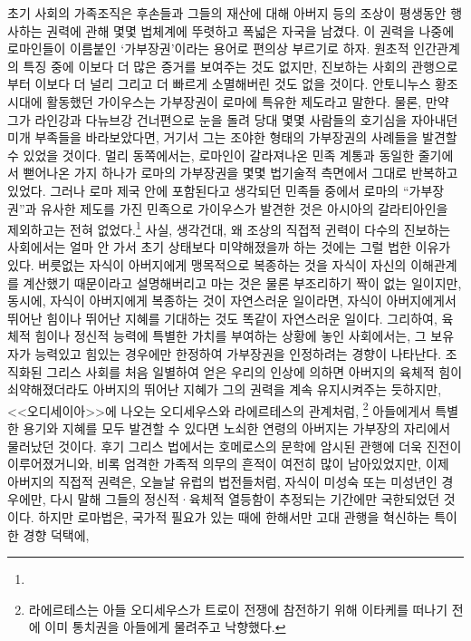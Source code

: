 초기 사회의 가족조직은
후손들과 그들의 재산에 대해
아버지 등의 조상이 평생동안 행사하는 권력에 관해
몇몇 법체계에 뚜렷하고 폭넓은 자국을 남겼다.
이 권력을 나중에 로마인들이 이름붙인
`가부장권'이라는 용어로 편의상 부르기로 하자.
원초적 인간관계의 특징 중에 이보다 더 많은 증거를 보여주는 것도 없지만,
진보하는 사회의 관행으로부터 이보다 더 널리 그리고 더 빠르게
소멸해버린 것도 없을 것이다.
안토니누스 황조 시대에 활동했던 가이우스는
가부장권이 로마에 특유한 제도라고 말한다.
물론, 만약 그가 라인강과 다뉴브강 건너편으로 눈을 돌려
당대 몇몇 사람들의 호기심을 자아내던 미개 부족들을 바라보았다면,
거기서 그는 조야한 형태의 가부장권의 사례들을 발견할 수 있었을 것이다.
멀리 동쪽에서는, 로마인이 갈라져나온 민족 계통과 동일한 줄기에서
뻗어나온 가지 하나가 로마의 가부장권을 몇몇 법기술적 측면에서
그대로 반복하고 있었다.
그러나
로마 제국 안에 포함된다고 생각되던 민족들 중에서
로마의 ``가부장권''과 유사한 제도를 가진 민족으로
가이우스가
발견한 것은
아시아의 갈라티아인을 제외하고는
전혀 없었다.\footnote{}
사실, 생각건대,
왜 조상의 직접적 귄력이
다수의 진보하는 사회에서는
얼마 안 가서 초기 상태보다 미약해졌을까 하는 것에는
그럴 법한 이유가 있다.
버릇없는 자식이 아버지에게 맹목적으로 복종하는 것을
자식이 자신의 이해관계를 계산했기 때문이라고 설명해버리고 마는 것은
물론 부조리하기 짝이 없는 일이지만,
동시에, 자식이 아버지에게 복종하는 것이 자연스러운 일이라면,
자식이 아버지에게서 뛰어난 힘이나 뛰어난 지혜를 기대하는 것도 똑같이
자연스러운 일이다.
그리하여,
육체적 힘이나 정신적 능력에 특별한 가치를 부여하는 상황에 놓인 사회에서는,
그 보유자가 능력있고 힘있는 경우에만 한정하여
가부장권을
인정하려는 경향이 나타난다.
조직화된 그리스 사회를 처음 일별하여 얻은 우리의 인상에 의하면
아버지의 육체적 힘이 쇠약해졌더라도 아버지의 뛰어난 지혜가
그의 권력을 계속 유지시켜주는 듯하지만,
<<오디세이아>>에 나오는
오디세우스와 라에르테스의 관계처럼,%
\footnote{라에르테스는 아들 오디세우스가 트로이 전쟁에 참전하기 위해
이타케를 떠나기 전에 이미 통치권을 아들에게 물려주고 낙향했다.}
아들에게서 특별한 용기와 지혜를 모두 발견할 수 있다면
노쇠한 연령의 아버지는 가부장의 자리에서 물러났던 것이다.
후기 그리스 법에서는
호메로스의 문학에 암시된 관행에 더욱 진전이 이루어졌거니와,
비록 엄격한 가족적 의무의 흔적이 여전히 많이 남아있었지만,
이제 아버지의 직접적 권력은, 오늘날 유럽의 법전들처럼,
자식이 미성숙 또는 미성년인 경우에만, 다시 말해 그들의 정신적^^b7육체적
열등함이 추정되는 기간에만 국한되었던 것이다.
하지만 로마법은,
국가적 필요가 있는 때에 한해서만 고대 관행을 혁신하는 특이한 경향 덕택에,
